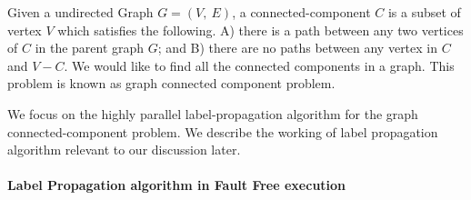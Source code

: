 Given a undirected Graph $G=(V,\ E)$, a connected-component $C$ is a subset of
vertex $V$ which satisfies the following.  A) there is a path between any two
vertices of $C$ in the parent graph $G$;  and B) there are no paths between
any vertex in $C$ and $V-C$. We would like to find all the connected
components in a graph. This problem is known as graph connected component
problem.

 We focus on the highly parallel label-propagation algorithm for the graph
connected-component problem.  We describe the working of label propagation
algorithm relevant to our discussion later. \paragraph{Label Propagation
algorithm in Fault Free execution}

